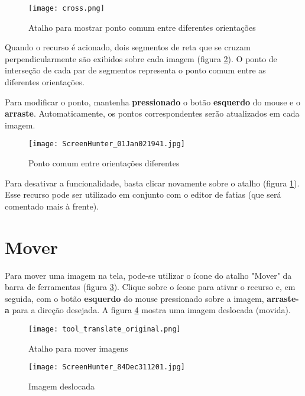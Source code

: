 \begin{figure}[!htb]
\centering
\texttt{[image: cross.png]}
\caption{Atalho para mostrar ponto comum entre diferentes orientações}
\label{fig:cross_icon}
\end{figure}

Quando o recurso é acionado, dois segmentos de reta que se cruzam perpendicularmente são exibidos
sobre cada imagem (figura \ref{fig:cross_all}). O ponto de interseção de cada par de segmentos
representa o ponto comum  entre as diferentes orientações.

\newpage

Para modificar o ponto, mantenha \textbf{pressionado} o botão \textbf{esquerdo} do mouse e o
\textbf{arraste}. Automaticamente, os pontos correspondentes serão atualizados em cada imagem.

\begin{figure}[!htb]
\centering
\texttt{[image: ScreenHunter\_01Jan021941.jpg]}
\caption{Ponto comum entre orientações diferentes}
\label{fig:cross_all}
\end{figure}

Para desativar a funcionalidade, basta clicar novamente sobre o atalho (figura \ref{fig:cross_icon}).
Esse recurso pode ser utilizado em conjunto com o editor de fatias (que será comentado mais à frente).

\newpage

\section{Mover}

Para mover uma imagem na tela, pode-se utilizar o ícone do atalho "Mover" da barra de ferramentas (figura
\ref{fig:move_icon}). Clique sobre o ícone para ativar o recurso e, em seguida, com o botão
\textbf{esquerdo} do mouse pressionado sobre a imagem, \textbf{arraste-a} para a direção desejada.
A figura \ref{fig:move_img} mostra uma imagem deslocada (movida).

\begin{figure}[!htb]
\centering
\texttt{[image: tool\_translate\_original.png]}
\caption{Atalho para mover imagens}
\label{fig:move_icon}
\end{figure}

\begin{figure}[!htb]
\centering
\texttt{[image: ScreenHunter\_84Dec311201.jpg]}
\caption{Imagem deslocada}
\label{fig:move_img}
\end{figure}

